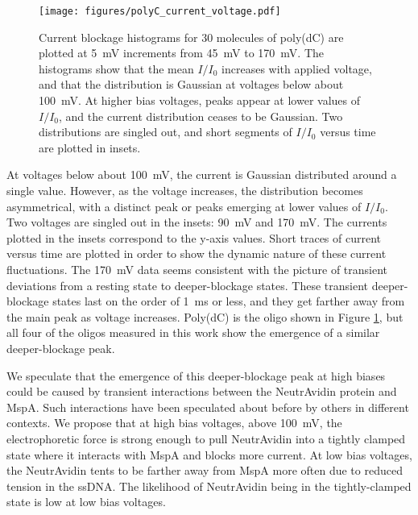 \begin{figure}[h]
\begin{centering}
\texttt{[image: figures/polyC\_current\_voltage.pdf]}
\caption[Current histograms for poly(dC) ssDNA versus voltage]{Current blockage histograms for \num{30} molecules of poly(dC) are plotted at \SI{5}{\mV} increments from \SI{45}{\mV} to \SI{170}{\mV}.  The histograms show that the mean $I/I_0$ increases with applied voltage, and that the distribution is Gaussian at voltages below about \SI{100}{\mV}.  At higher bias voltages, peaks appear at lower values of $I/I_0$, and the current distribution ceases to be Gaussian.  Two distributions are singled out, and short segments of $I/I_0$ versus time are plotted in insets.}
\label{fig:polyC_hists}
\end{centering}
\end{figure}

At voltages below about \SI{100}{\mV}, the current is Gaussian distributed around a single value.  However, as the voltage increases, the distribution becomes asymmetrical, with a distinct peak or peaks emerging at lower values of $I/I_0$.  Two voltages are singled out in the insets: \SI{90}{\mV} and \SI{170}{\mV}.  The currents plotted in the insets correspond to the y-axis values.  Short traces of current versus time are plotted in order to show the dynamic nature of these current fluctuations.  The \SI{170}{\mV} data seems consistent with the picture of transient deviations from a resting state to deeper-blockage states.  These transient deeper-blockage states last on the order of \SI{1}{\ms} or less, and they get farther away from the main peak as voltage increases.  Poly(dC) is the oligo shown in Figure \ref{fig:polyC_hists}, but all four of the oligos measured in this work show the emergence of a similar deeper-blockage peak.

We speculate that the emergence of this deeper-blockage peak at high biases could be caused by transient interactions between the NeutrAvidin protein and MspA.  Such interactions have been speculated about before by others \citep{Manrao2011} in different contexts.  We propose that at high bias voltages, above \SI{100}{\mV}, the electrophoretic force is strong enough to pull NeutrAvidin into a tightly clamped state where it interacts with MspA and blocks more current.  At low bias voltages, the NeutrAvidin tents to be farther away from MspA more often due to reduced tension in the ssDNA.  The likelihood of NeutrAvidin being in the tightly-clamped state is low at low bias voltages.

